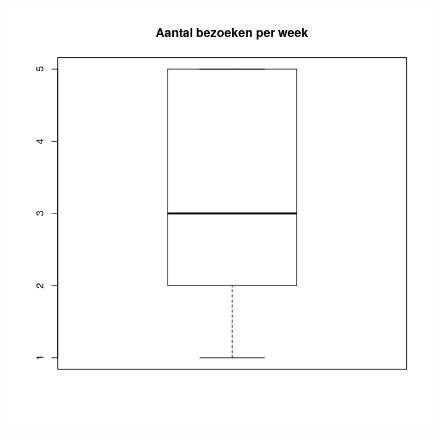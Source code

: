\documentclass{beamer}
\begin{document}
\begin{frame}
\begin{columns}
    \begin{column}{0.5\textwidth}
      \begin{figure}
        \centering
        \includegraphics[width=1.00\textwidth]{img/2var-boxplot-aantalbezoeken}
        \label{fig:boxplotStudenten2}
      \end{figure}
    \end{column}
  
  \end{columns}
\end{frame}
\end{document}

